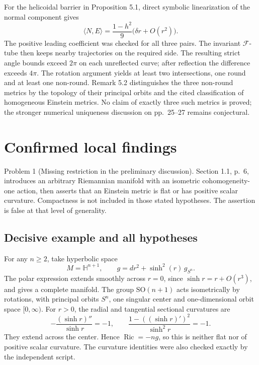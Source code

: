 \documentclass[10pt]{article}
\begin{document}
For the helicoidal barrier in Proposition 5.1, direct symbolic linearization of the normal component gives \[\langle N,E\rangle
       =\frac{1-h^2}{9}\bigl(\delta r+O(r^2)\bigr).\] The positive leading coefficient was checked for all three pairs. The invariant \(\mathcal F\)-tube then keeps nearby trajectories on the required side. The resulting strict angle bounds exceed \(2\pi\) on each unreflected curve; after reflection the difference exceeds \(4\pi\). The rotation argument yields at least two intersections, one round and at least one non-round. Remark 5.2 distinguishes the three non-round metrics by the topology of their principal orbits and the cited classification of homogeneous Einstein metrics. No claim of exactly three such metrics is proved; the stronger numerical uniqueness discussion on pp. 25–27 remains conjectural.\par
\section*{Confirmed local findings}
Problem 1 (Missing restriction in the preliminary discussion).  Section 1.1, p. 6, introduces an arbitrary Riemannian manifold with an isometric cohomogeneity-one action, then asserts that an Einstein metric is flat or has positive scalar curvature. Compactness is not included in those stated hypotheses. The assertion is false at that level of generality.\par
\subsection*{Decisive example and all hypotheses}
For any \(n\ge2\), take hyperbolic space \[M=\mathbb H^{n+1},\qquad
 g=dr^2+\sinh^2(r)\,g_{S^n}.\] The polar expression extends smoothly across \(r=0\), since \(\sinh r=r+O(r^3)\), and gives a complete manifold. The group \(\mathrm{SO}(n+1)\) acts isometrically by rotations, with principal orbits \(S^n\), one singular center and one-dimensional orbit space \([0,\infty)\). For \(r>0\), the radial and tangential sectional curvatures are \[-\frac{(\sinh r)''}{\sinh r}=-1,\qquad
 \frac{1-((\sinh r)')^2}{\sinh^2r}=-1.\] They extend across the center. Hence \(\operatorname{Ric}=-ng\), so this is neither flat nor of positive scalar curvature. The curvature identities were also checked exactly by the independent script.\par
\end{document}
